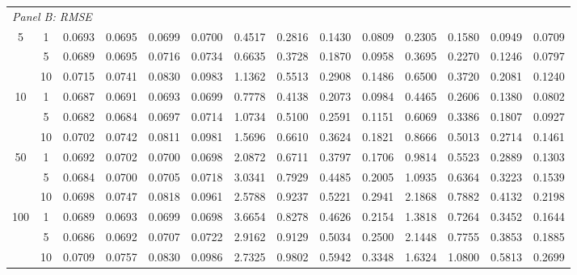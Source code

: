 \documentclass[12pt]{article}
\numberwithin{equation}{section}
\begin{document}
\begin{table}[ht]
{\begin{tabular}{cc|cccc|cccc|cccc}
\hline
\multicolumn{14}{l}{\textit{Panel B: RMSE}}\\
5   & 1  & 0.0693 & 0.0695 & 0.0699 & 0.0700 & 0.4517 & 0.2816 & 0.1430 & 0.0809 & 0.2305 & 0.1580 & 0.0949 & 0.0709 \\
    & 5  & 0.0689 & 0.0695 & 0.0716 & 0.0734 & 0.6635 & 0.3728 & 0.1870 & 0.0958 & 0.3695 & 0.2270 & 0.1246 & 0.0797 \\
    & 10 & 0.0715 & 0.0741 & 0.0830 & 0.0983 & 1.1362 & 0.5513 & 0.2908 & 0.1486 & 0.6500 & 0.3720 & 0.2081 & 0.1240 \\
10  & 1  & 0.0687 & 0.0691 & 0.0693 & 0.0699 & 0.7778 & 0.4138 & 0.2073 & 0.0984 & 0.4465 & 0.2606 & 0.1380 & 0.0802 \\
    & 5  & 0.0682 & 0.0684 & 0.0697 & 0.0714 & 1.0734 & 0.5100 & 0.2591 & 0.1151 & 0.6069 & 0.3386 & 0.1807 & 0.0927 \\
    & 10 & 0.0702 & 0.0742 & 0.0811 & 0.0981 & 1.5696 & 0.6610 & 0.3624 & 0.1821 & 0.8666 & 0.5013 & 0.2714 & 0.1461 \\
50  & 1  & 0.0692 & 0.0702 & 0.0700 & 0.0698 & 2.0872 & 0.6711 & 0.3797 & 0.1706 & 0.9814 & 0.5523 & 0.2889 & 0.1303 \\
    & 5  & 0.0684 & 0.0700 & 0.0705 & 0.0718 & 3.0341 & 0.7929 & 0.4485 & 0.2005 & 1.0935 & 0.6364 & 0.3223 & 0.1539 \\
    & 10 & 0.0698 & 0.0747 & 0.0818 & 0.0961 & 2.5788 & 0.9237 & 0.5221 & 0.2941 & 2.1868 & 0.7882 & 0.4132 & 0.2198 \\
100 & 1  & 0.0689 & 0.0693 & 0.0699 & 0.0698 & 3.6654 & 0.8278 & 0.4626 & 0.2154 & 1.3818 & 0.7264 & 0.3452 & 0.1644 \\
    & 5  & 0.0686 & 0.0692 & 0.0707 & 0.0722 & 2.9162 & 0.9129 & 0.5034 & 0.2500 & 2.1448 & 0.7755 & 0.3853 & 0.1885 \\
    & 10 & 0.0709 & 0.0757 & 0.0830 & 0.0986 & 2.7325 & 0.9802 & 0.5942 & 0.3348 & 1.6324 & 1.0800 & 0.5813 & 0.2699 \\
\hline
\end{tabular}}
\label{tab:VARMA_bias_RMSE_1000}
\end{table}
\end{document}
